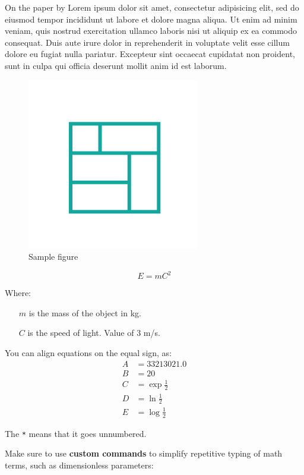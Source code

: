 
On the paper by \citet{bos2015novel} Lorem ipsum dolor sit amet, consectetur adipisicing elit, sed do eiusmod
tempor incididunt ut labore et dolore magna aliqua. Ut enim ad minim veniam,
quis nostrud exercitation ullamco laboris nisi ut aliquip ex ea commodo
consequat. Duis aute irure dolor in reprehenderit in voluptate velit esse
cillum dolore eu fugiat nulla pariatur. Excepteur sint occaecat cupidatat non
proident, sunt in culpa qui officia deserunt mollit anim id est laborum.

\begin{figure}[H] %
    \centering
    \includegraphics[height=0.3\linewidth]{images/Profile.png}
    \caption{Sample figure}
    \label{fig:sample}
\end{figure}

\begin{equation} \label{eq:sample}         %
    E = m C^{2} 
\end{equation}

Where:
\begin{itemize}
    \item[$m$] is the mass of the object in kg.
    \item[$C$] is the speed of light. Value of 3 m/s.
\end{itemize}

You can align equations on the equal sign, as:
\begin{align*} \label{eq:aligned}         %
    A       &=   33213021.0
    \\
    B       &=   20    
    \\
    C       &=  \exp{\frac{1}{2}}
    \\
    D       &=  \ln{\frac{1}{2}}
    \\
    E       &=  \log{\frac{1}{2}}
\end{align*}

The \texttt{*} means that it goes unnumbered.

Make sure to use \textbf{custom commands} to simplify repetitive typing of math terms, such as dimensionless parameters:

